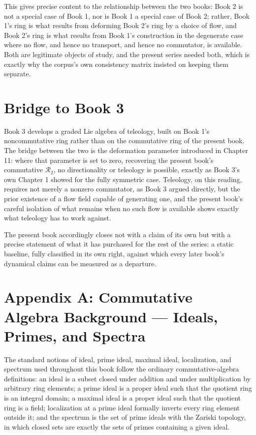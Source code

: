 This gives precise content to the relationship between the two books: Book 2 is not a special case of Book 1, nor is Book 1 a special case of Book 2; rather, Book 1's ring is what results from deforming Book 2's ring by a choice of flow, and Book 2's ring is what results from Book 1's construction in the degenerate case where no flow, and hence no transport, and hence no commutator, is available. Both are legitimate objects of study, and the present series needed both, which is exactly why the corpus's own consistency matrix insisted on keeping them separate.

\chapter{Bridge to Book 3}

Book 3 develops a graded Lie algebra of teleology, built on Book 1's noncommutative ring rather than on the commutative ring of the present book. The bridge between the two is the deformation parameter introduced in Chapter 11: where that parameter is set to zero, recovering the present book's commutative $\mathcal{R}_2$, no directionality or teleology is possible, exactly as Book 3's own Chapter 1 showed for the fully symmetric case. Teleology, on this reading, requires not merely a nonzero commutator, as Book 3 argued directly, but the prior existence of a flow field capable of generating one, and the present book's careful isolation of what remains when no such flow is available shows exactly what teleology has to work against.

The present book accordingly closes not with a claim of its own but with a precise statement of what it has purchased for the rest of the series: a static baseline, fully classified in its own right, against which every later book's dynamical claims can be measured as a departure.

\chapter*{Appendix A: Commutative Algebra Background --- Ideals, Primes, and Spectra}

The standard notions of ideal, prime ideal, maximal ideal, localization, and spectrum used throughout this book follow the ordinary commutative-algebra definitions: an ideal is a subset closed under addition and under multiplication by arbitrary ring elements; a prime ideal is a proper ideal such that the quotient ring is an integral domain; a maximal ideal is a proper ideal such that the quotient ring is a field; localization at a prime ideal formally inverts every ring element outside it; and the spectrum is the set of prime ideals with the Zariski topology, in which closed sets are exactly the sets of primes containing a given ideal.

